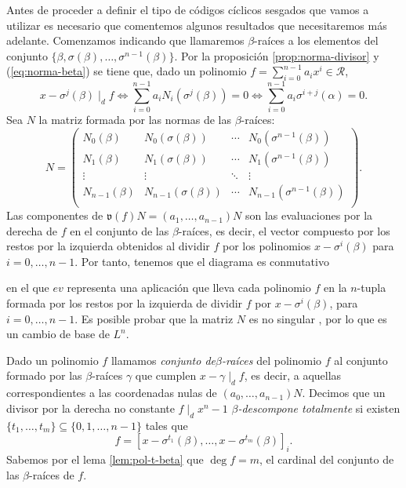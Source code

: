 Antes de proceder a definir el tipo de códigos cíclicos sesgados que vamos a utilizar es necesario que comentemos algunos resultados que necesitaremos más adelante.
Comenzamos indicando que llamaremos \(\beta\)-raíces a los elementos del conjunto \(\{\beta, \sigma(\beta), \dots, \sigma^{n-1}(\beta)\}\).
Por la proposición \ref{prop:norma-divisor} y (\ref{eq:norma-beta}) se tiene que, dado un polinomio \(f = \sum_{i=0}^{n-1}a_ix^i \in \mathcal R\),
\begin{equation}
  \label{eq:equivalencias-divisor-sigma-b}
  x - \sigma^j(\beta) \mid_d f \iff \sum_{i=0}^{n-1}a_iN_i(\sigma^j(\beta)) = 0 \iff \sum_{i=0}^{n-1}a_i\sigma^{i+j}(\alpha) = 0.
\end{equation}
Sea \(N\) la matriz formada por las normas de las \(\beta\)-raíces:
\[
  N = \begin{pmatrix}
    N_0(\beta) & N_0(\sigma(\beta)) & \cdots & N_0(\sigma^{n-1}(\beta))\\
    N_1(\beta) & N_1(\sigma(\beta)) & \cdots & N_1(\sigma^{n-1}(\beta))\\
    \vdots & \vdots & \ddots & \vdots\\
    N_{n-1}(\beta) & N_{n-1}(\sigma(\beta)) & \cdots & N_{n-1}(\sigma^{n-1}(\beta))\\
  \end{pmatrix}.
\]
Las componentes de \(\mathfrak v(f)N = (a_1, \dots, a_{n-1})N\) son las evaluaciones por la derecha de \(f\) en el conjunto de las \(\beta\)-raíces, es decir, el vector compuesto por los restos por la izquierda obtenidos al dividir \(f\) por los polinomios \(x - \sigma^i(\beta)\) para \(i = 0, \dots, n - 1\).
Por tanto, tenemos que el diagrama es conmutativo
\begin{center}
\end{center}
en el que \(ev\) representa una aplicación que lleva cada polinomio \(f\) en la \(n\)-tupla formada por los restos por la izquierda de dividir \(f\) por \(x - \sigma^i(\beta)\), para \(i = 0, \dots, n - 1\).
Es posible probar que la matriz \(N\) es no singular \parencite[ver][Lema 2.1]{gomez-torrecillas_petersongorensteinzierler_2018}, por lo que es un cambio de base de \(L^n\).

Dado un polinomio \(f\) llamamos \emph{conjunto de}\(\beta\)\emph{-raíces} del polinomio \(f\) al conjunto formado por las \(\beta\)-raíces \(\gamma\) que cumplen \(x - \gamma \mid_d f\), es decir, a aquellas correspondientes a las coordenadas nulas de \((a_0, \dots, a_{n-1})N\).
Decimos que un divisor por la derecha no constante \(f \mid_d x^n - 1\) \(\beta\)\emph{-descompone totalmente} si existen \(\{t_1, \dots, t_m\} \subseteq \{0, 1, \dots, n-1\}\) tales que
\[
  f = \left[x - \sigma^{t_1}(\beta), \dots, x - \sigma^{t_m}(\beta)\right]_{i}.
\]
Sabemos por el lema \ref{lem:pol-t-beta} que \(\deg f = m\), el cardinal del conjunto de las \(\beta\)-raíces de \(f\).

